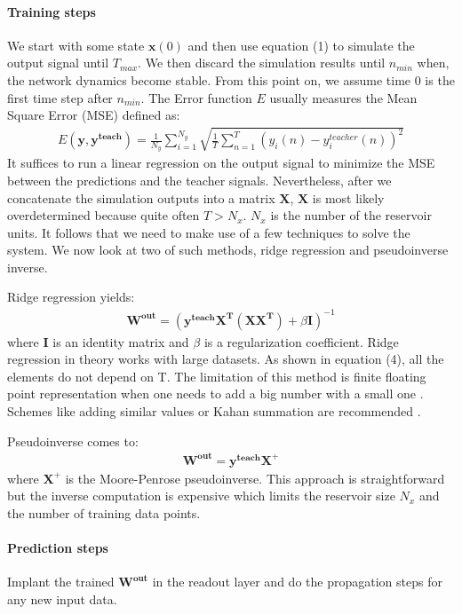 \documentclass[a4paper,11pt,oneside]{article}
\begin{document}
\paragraph{Training steps} We start with some state $\mathbf{x}(0)$ and then use equation (1) to simulate the output signal until $T_{max}$. We then discard the simulation results until $n_{min}$ when, the network dynamics become stable. From this point on, we assume time 0 is the first time step after $n_{min}$. The Error function $E$ usually measures the Mean Square Error (MSE)  defined as:
\begin{align}
E(\mathbf{y, y^{teach}}) = \frac{1}{N_y} \sum^{N_y}_{i=1} \sqrt{\frac{1}{T} \sum^{T}_{n=1}(y_i(n) - y_i^{teacher}(n) )^2}
\end{align} 
It suffices to run a linear regression on the output signal to minimize the MSE between the predictions and the teacher signals. Nevertheless, after we concatenate the simulation outputs into a matrix $\mathbf{X}$, $\mathbf{X}$ is most likely overdetermined because quite often $ T > N_x $. $N_x$ is the number of the reservoir units. It follows that we need to make use of a few techniques to solve the system. We now look at two of such methods, ridge regression and pseudoinverse inverse.

Ridge regression yields:
\begin{align}
\mathbf{W^{out}} = (\mathbf{y^{teach}X^T(XX^T )} + \beta \mathbf{I})^{-1}
\end{align}
where $\mathbf{I}$ is an identity matrix and $\beta$ is a regularization coefficient. Ridge regression in theory works with large datasets. As shown in equation (4), all the elements do not depend on T. The  limitation of this method is finite floating point representation when one needs to add a big number with a small one \cite{lukovsevivcius2012practical}. Schemes like adding similar values or Kahan summation are recommended \cite{Kahan1965}. 

Pseudoinverse comes to:
\begin{align}
\mathbf{W^{out}} = \mathbf{y^{teach}X^+}
\end{align}
where $\mathbf{X}^+$ is the Moore-Penrose pseudoinverse. This approach is straightforward but the inverse computation is expensive which limits the reservoir size $N_x$ and the number of training data points.

\paragraph{Prediction steps} Implant the trained $\mathbf{W^{out}}$ in the readout layer and do the propagation steps for any new input data. 
 
\end{document}
